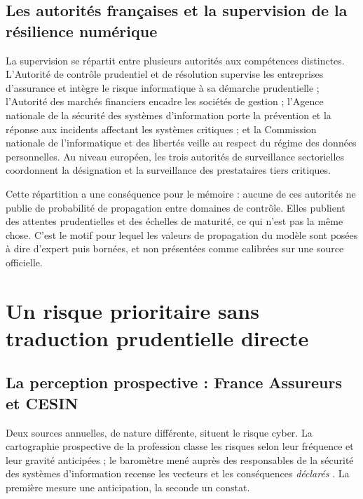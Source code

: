 \subsection{Les autorités françaises et la supervision de la résilience numérique}
\label{subsec:supervision-france}

La supervision se répartit entre plusieurs autorités aux compétences distinctes. L'Autorité de
contrôle prudentiel et de résolution supervise les entreprises d'assurance et intègre le risque
informatique à sa démarche prudentielle ; l'Autorité des marchés financiers encadre les sociétés
de gestion ; l'Agence nationale de la sécurité des systèmes d'information porte la prévention et
la réponse aux incidents affectant les systèmes critiques ; et la Commission nationale de
l'informatique et des libertés veille au respect du régime des données personnelles. Au niveau
européen, les trois autorités de surveillance sectorielles coordonnent la désignation et la
surveillance des prestataires tiers critiques.

Cette répartition a une conséquence pour le mémoire : aucune de ces autorités ne publie de
probabilité de propagation entre domaines de contrôle. Elles publient des attentes prudentielles
et des échelles de maturité, ce qui n'est pas la même chose. C'est le motif pour lequel les
valeurs de propagation du modèle sont posées à dire d'expert puis bornées, et non présentées
comme calibrées sur une source officielle.

\section{Un risque prioritaire sans traduction prudentielle directe}
\label{sec:enjeu-prudentiel}

\subsection{La perception prospective : France Assureurs et CESIN}
\label{subsec:france-assureurs-cesin}

Deux sources annuelles, de nature différente, situent le risque cyber. La cartographie
prospective de la profession classe les risques selon leur fréquence et leur gravité anticipées
\citep{franceassureurs2026} ; le baromètre mené auprès des responsables de la sécurité des
systèmes d'information recense les vecteurs et les conséquences \emph{déclarés}
\citep{cesin2026}. La première mesure une anticipation, la seconde un constat.

